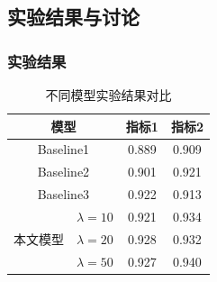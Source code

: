 \documentclass[AutoFakeBold,AutoFakeSlant]{beamer}
\begin{document}
\subsection{实验结果与讨论}

\begin{frame}
  \frametitle{实验结果}

  \begin{table}[ht]
  \footnotesize
  \caption{不同模型实验结果对比}
  \centering
  \begin{tabular}{clcc}
  \toprule
  \multicolumn{2}{c}{\textbf{模型}} & \textbf{指标1} & \textbf{指标2} \\
  \midrule
  \multicolumn{2}{c}{Baseline1} & 0.889 & 0.909 \\
  \multicolumn{2}{c}{Baseline2} & 0.901 & 0.921 \\
  \multicolumn{2}{c}{Baseline3} & 0.922 & 0.913 \\
  \midrule
  \multirow{3}{*}{本文模型} & $\lambda=10$ & 0.921 & 0.934 \\
  & $\lambda=20$ & 0.928 & 0.932 \\
  & $\lambda=50$ & 0.927 & 0.940 \\
  \bottomrule
  \end{tabular}
  \label{result}
  \end{table}
\end{frame}
\end{document}

